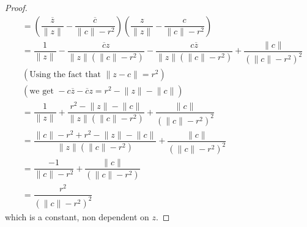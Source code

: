 \documentclass{article}
\begin{document}
\begin{itemize}
\begin{proof}
\begin{align*}
                                                                                                              &= \left(\dfrac{\overline{z}}{\lVert z \rVert} - \dfrac{\overline{c}}{\lVert c \rVert - r^{2}}\right)\left(\dfrac{z}{\lVert z \rVert} - \dfrac{c}{\lVert c \rVert - r^{2}}\right)                                           \\
                                                                                                              &= \dfrac{1}{\lVert z \rVert} - \dfrac{\overline{c}z}{\lVert z \rVert(\lVert c \rVert - r^{2})} - \dfrac{c \overline{z}}{\lVert z \rVert(\lVert c \rVert - r^{2})} + \dfrac{\lVert c \rVert}{(\lVert c \rVert - r^{2})^{2}} \\
                                                                                                              & (\text{Using the fact that } \lVert z - c \rVert = r^{2}) \\
                                                                                                              & (\text{we get } -c\overline{z} - \overline{c}z = r^{2} - \lVert z \rVert - \lVert c \rVert) \\
                                                                                                              &= \dfrac{1}{\lVert z \rVert} + \dfrac{r^{2} - \lVert z \rVert - \lVert c \rVert}{\lVert z \rVert(\lVert c \rVert - r^{2})} + \dfrac{\lVert c \rVert}{(\lVert c \rVert - r^{2})^{2}}                                        \\
                                                                                                              &= \dfrac{\lVert c \rVert - r^{2} + r^{2} - \lVert z \rVert - \lVert c \rVert}{\lVert z \rVert (\lVert c \rVert - r^{2})} + \dfrac{\lVert c \rVert}{(\lVert c \rVert - r^{2})^{2}}                                          \\
                                                                                                              &= \dfrac{-1}{\lVert c \rVert - r^{2}} + \dfrac{\lVert c \rVert}{(\lVert c \rVert - r^{2})}                                                                                                                                 \\
                                                                                                              &= \dfrac{r^{2}}{(\lVert c \rVert - r^{2})^{2}}                                                                                                                                                                               
                    \end{align*}
                which is a constant, non dependent on $z$.
            \end{proof}



\end{itemize}
\end{document}
